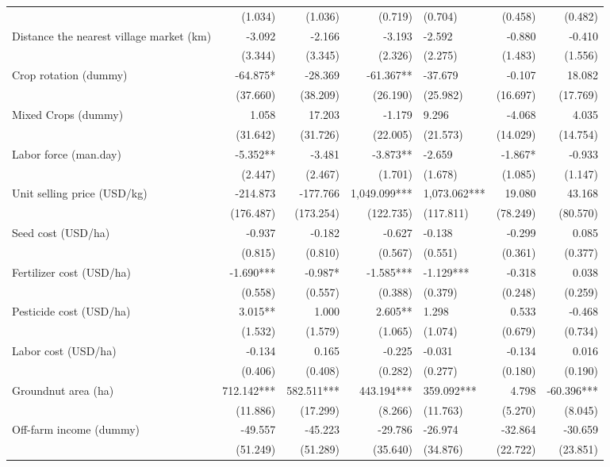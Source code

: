 \documentclass[
]{article}
\begin{document}
\begin{landscape}
\begin{longtable}[t]{lrrrlrr}
 & (1.034) & (1.036) & (0.719) & (0.704) & (0.458) & (0.482)\\
Distance the nearest village market (km) & -3.092 & -2.166 & -3.193 & -2.592 & -0.880 & -0.410\\
 & (3.344) & (3.345) & (2.326) & (2.275) & (1.483) & (1.556)\\
Crop rotation (dummy) & -64.875* & -28.369 & -61.367** & -37.679 & -0.107 & 18.082\\
\addlinespace
 & (37.660) & (38.209) & (26.190) & (25.982) & (16.697) & (17.769)\\
Mixed Crops (dummy) & 1.058 & 17.203 & -1.179 & 9.296 & -4.068 & 4.035\\
 & (31.642) & (31.726) & (22.005) & (21.573) & (14.029) & (14.754)\\
Labor force (man.day) & -5.352** & -3.481 & -3.873** & -2.659 & -1.867* & -0.933\\
 & (2.447) & (2.467) & (1.701) & (1.678) & (1.085) & (1.147)\\
\addlinespace
Unit selling price (USD/kg) & -214.873 & -177.766 & 1,049.099*** & 1,073.062*** & 19.080 & 43.168\\
 & (176.487) & (173.254) & (122.735) & (117.811) & (78.249) & (80.570)\\
Seed cost (USD/ha) & -0.937 & -0.182 & -0.627 & -0.138 & -0.299 & 0.085\\
 & (0.815) & (0.810) & (0.567) & (0.551) & (0.361) & (0.377)\\
Fertilizer cost (USD/ha) & -1.690*** & -0.987* & -1.585*** & -1.129*** & -0.318 & 0.038\\
\addlinespace
 & (0.558) & (0.557) & (0.388) & (0.379) & (0.248) & (0.259)\\
Pesticide cost (USD/ha) & 3.015** & 1.000 & 2.605** & 1.298 & 0.533 & -0.468\\
 & (1.532) & (1.579) & (1.065) & (1.074) & (0.679) & (0.734)\\
Labor cost (USD/ha) & -0.134 & 0.165 & -0.225 & -0.031 & -0.134 & 0.016\\
 & (0.406) & (0.408) & (0.282) & (0.277) & (0.180) & (0.190)\\
\addlinespace
Groundnut area (ha) & 712.142*** & 582.511*** & 443.194*** & 359.092*** & 4.798 & -60.396***\\
 & (11.886) & (17.299) & (8.266) & (11.763) & (5.270) & (8.045)\\
Off-farm income (dummy) & -49.557 & -45.223 & -29.786 & -26.974 & -32.864 & -30.659\\
 & (51.249) & (51.289) & (35.640) & (34.876) & (22.722) & (23.851)\\

\end{longtable}
\end{landscape}
\end{document}
